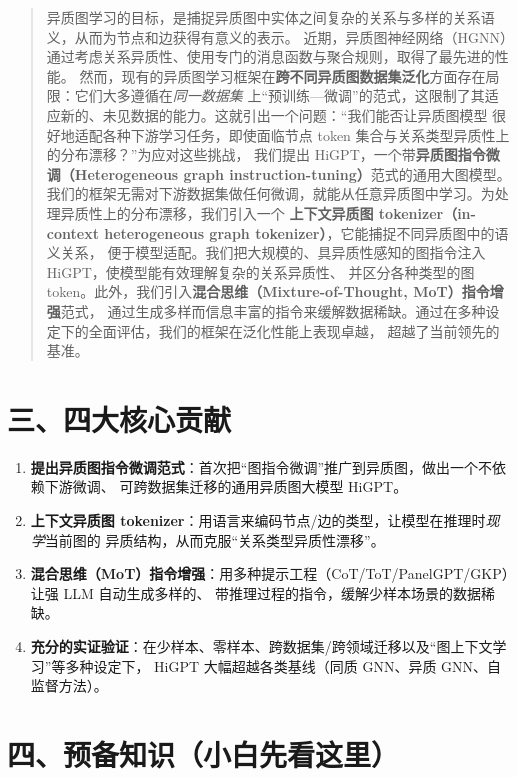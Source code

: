 \documentclass[11pt,UTF8,fontset=fandol]{ctexart}
\begin{document}
\begin{quote}
异质图学习的目标，是捕捉异质图中实体之间复杂的关系与多样的关系语义，从而为节点和边获得有意义的表示。
近期，异质图神经网络（HGNN）通过考虑关系异质性、使用专门的消息函数与聚合规则，取得了最先进的性能。
然而，现有的异质图学习框架在\textbf{跨不同异质图数据集泛化}方面存在局限：它们大多遵循在\emph{同一数据集}
上“预训练—微调”的范式，这限制了其适应新的、未见数据的能力。这就引出一个问题：“我们能否让异质图模型
很好地适配各种下游学习任务，即使面临节点 token 集合与关系类型异质性上的分布漂移？”为应对这些挑战，
我们提出 HiGPT，一个带\textbf{异质图指令微调（Heterogeneous graph instruction-tuning）}范式的通用大图模型。
我们的框架无需对下游数据集做任何微调，就能从任意异质图中学习。为处理异质性上的分布漂移，我们引入一个
\textbf{上下文异质图 tokenizer（in-context heterogeneous graph tokenizer）}，它能捕捉不同异质图中的语义关系，
便于模型适配。我们把大规模的、具异质性感知的图指令注入 HiGPT，使模型能有效理解复杂的关系异质性、
并区分各种类型的图 token。此外，我们引入\textbf{混合思维（Mixture-of-Thought, MoT）指令增强}范式，
通过生成多样而信息丰富的指令来缓解数据稀缺。通过在多种设定下的全面评估，我们的框架在泛化性能上表现卓越，
超越了当前领先的基准。
\end{quote}

\section{三、四大核心贡献}
\begin{enumerate}[leftmargin=2em]
  \item \textbf{提出异质图指令微调范式}：首次把“图指令微调”推广到异质图，做出一个不依赖下游微调、
        可跨数据集迁移的通用异质图大模型 HiGPT。
  \item \textbf{上下文异质图 tokenizer}：用语言来编码节点/边的类型，让模型在推理时\emph{现学}当前图的
        异质结构，从而克服“关系类型异质性漂移”。
  \item \textbf{混合思维（MoT）指令增强}：用多种提示工程（CoT/ToT/PanelGPT/GKP）让强 LLM 自动生成多样的、
        带推理过程的指令，缓解少样本场景的数据稀缺。
  \item \textbf{充分的实证验证}：在少样本、零样本、跨数据集/跨领域迁移以及“图上下文学习”等多种设定下，
        HiGPT 大幅超越各类基线（同质 GNN、异质 GNN、自监督方法）。
\end{enumerate}

\section{四、预备知识（小白先看这里）}
\end{document}
